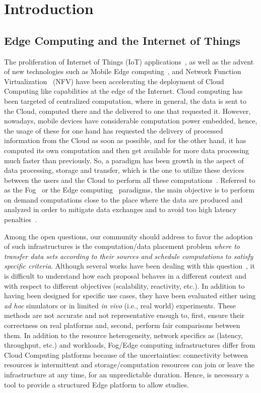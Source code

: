 \chapter{Introduction}
\label{sec:intro}

\section{Edge Computing and the Internet of Things}

The proliferation of Internet of Things (IoT) applications~\cite{atzori2010internet}, as well as the advent of new technologies such as
Mobile Edge computing~\cite{7727082}, and Network Function Virtualization~\cite{mijumbi2015network} (NFV) have been accelerating the deployment of Cloud Computing like capabilities at the edge of the Internet. Cloud computing has been targeted of centralized computation, where in general, the data is sent to the Cloud, computed there and the delivered to one that requested it. However, nowadays, mobile devices have considerable computation power embedded, hence, the usage of these for one hand has requested the delivery of processed information from the Cloud as soon as possible, and for the other hand, it has computed its own computation and then get available for more data processing much faster than previously. So, a paradigm has been growth in the aspect of data processing, storage and transfer, which is the one to utilize these devices between the users and the Cloud to perform all these computations~\cite{iot_fog_cloud}.
Referred to as the Fog~\cite{DBLP:conf/sigcomm/BonomiMZA12} or the Edge computing~\cite{shi2016} paradigms, the main objective is to perform on demand computations close to the place where the data are produced and analyzed in order to mitigate data exchanges and to avoid too high latency penalties~\cite{zhang2015cloud}.

Among the open questions, our community should address to favor the adoption of such infrastructures is the computation/data placement problem \ie \textit{where to transfer data sets according to their sources and schedule computations to satisfy specific criteria}.
Although several works have been dealing with this question~\cite{Yousefpour17,Brogi17b,Skarlat17a,Xia18,Naas17,Donassolo18, aitsalaht:hal-02108806}, it is difficult to understand how each proposal behaves in a different context and with respect to different objectives (scalability, reactivity, etc.).
In addition to having been designed for specific use cases, they have been evaluated either using \textit{ad hoc} simulators or in limited \textit{in vivo} (i.e., real world) experiments.
These methods are not accurate and not representative enough to, first, ensure their correctness on real platforms and, second, perform fair comparisons between them. In addition to the resource heterogeneity, network specifics as (latency, throughput, etc.) and workloads, Fog/Edge computing infrastructures differ from Cloud Computing platforms because of the uncertainties: connectivity between resources is intermittent and storage/computation resources can join or leave the infrastructure at any time, for an unpredictable duration. Hence, is necessary a tool to provide a structured Edge platform to allow studies.

